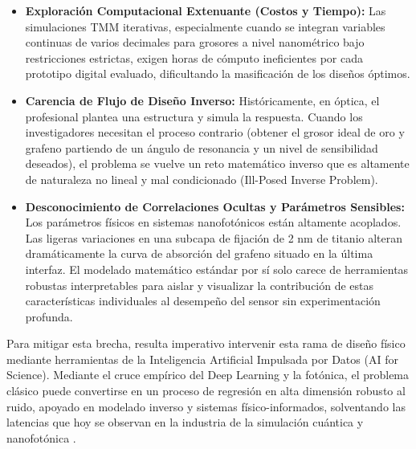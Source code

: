 \begin{itemize}
    \item \textbf{Exploración Computacional Extenuante (Costos y Tiempo):} Las simulaciones TMM iterativas, especialmente cuando se integran variables continuas de varios decimales para grosores a nivel nanométrico bajo restricciones estrictas, exigen horas de cómputo ineficientes por cada prototipo digital evaluado, dificultando la masificación de los diseños óptimos.
    \item \textbf{Carencia de Flujo de Diseño Inverso:} Históricamente, en óptica, el profesional plantea una estructura y simula la respuesta. Cuando los investigadores necesitan el proceso contrario (obtener el grosor ideal de oro y grafeno partiendo de un ángulo de resonancia y un nivel de sensibilidad deseados), el problema se vuelve un reto matemático inverso que es altamente de naturaleza no lineal y mal condicionado (Ill-Posed Inverse Problem).
    \item \textbf{Desconocimiento de Correlaciones Ocultas y Parámetros Sensibles:} Los parámetros físicos en sistemas nanofotónicos están altamente acoplados. Las ligeras variaciones en una subcapa de fijación de 2 nm de titanio alteran dramáticamente la curva de absorción del grafeno situado en la última interfaz. El modelado matemático estándar por sí solo carece de herramientas robustas interpretables para aislar y visualizar la contribución de estas características individuales al desempeño del sensor sin experimentación profunda.
\end{itemize}

Para mitigar esta brecha, resulta imperativo intervenir esta rama de diseño físico mediante herramientas de la Inteligencia Artificial Impulsada por Datos (AI for Science). Mediante el cruce empírico del Deep Learning y la fotónica, el problema clásico puede convertirse en un proceso de regresión en alta dimensión robusto al ruido, apoyado en modelado inverso y sistemas físico-informados, solventando las latencias que hoy se observan en la industria de la simulación cuántica y nanofotónica \cite{pinn_nanophotonics, xai_spr_sensors}.
